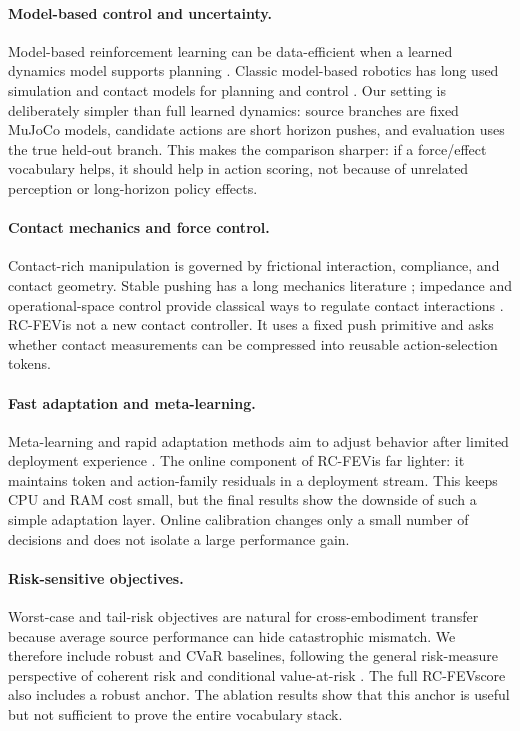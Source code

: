 \documentclass{article}
\newcommand{\method}{RC-FEV}
\begin{document}
\paragraph{Model-based control and uncertainty.}
Model-based reinforcement learning can be data-efficient when a learned dynamics model supports planning \citep{nagabandi2018neural,chua2018pets}. Classic model-based robotics has long used simulation and contact models for planning and control \citep{todorov2012mujoco,erez2015simulation}. Our setting is deliberately simpler than full learned dynamics: source branches are fixed MuJoCo models, candidate actions are short horizon pushes, and evaluation uses the true held-out branch. This makes the comparison sharper: if a force/effect vocabulary helps, it should help in action scoring, not because of unrelated perception or long-horizon policy effects.

\paragraph{Contact mechanics and force control.}
Contact-rich manipulation is governed by frictional interaction, compliance, and contact geometry. Stable pushing has a long mechanics literature \citep{lynch1996stable,mason2001mechanics}; impedance and operational-space control provide classical ways to regulate contact interactions \citep{hogan1985impedance,khatib1987operational}. \method is not a new contact controller. It uses a fixed push primitive and asks whether contact measurements can be compressed into reusable action-selection tokens.

\paragraph{Fast adaptation and meta-learning.}
Meta-learning and rapid adaptation methods aim to adjust behavior after limited deployment experience \citep{finn2017maml,kumar2021rma}. The online component of \method is far lighter: it maintains token and action-family residuals in a deployment stream. This keeps CPU and RAM cost small, but the final results show the downside of such a simple adaptation layer. Online calibration changes only a small number of decisions and does not isolate a large performance gain.

\paragraph{Risk-sensitive objectives.}
Worst-case and tail-risk objectives are natural for cross-embodiment transfer because average source performance can hide catastrophic mismatch. We therefore include robust and CVaR baselines, following the general risk-measure perspective of coherent risk and conditional value-at-risk \citep{artzner1999coherent,rockafellar2000optimization}. The full \method score also includes a robust anchor. The ablation results show that this anchor is useful but not sufficient to prove the entire vocabulary stack.
\end{document}

